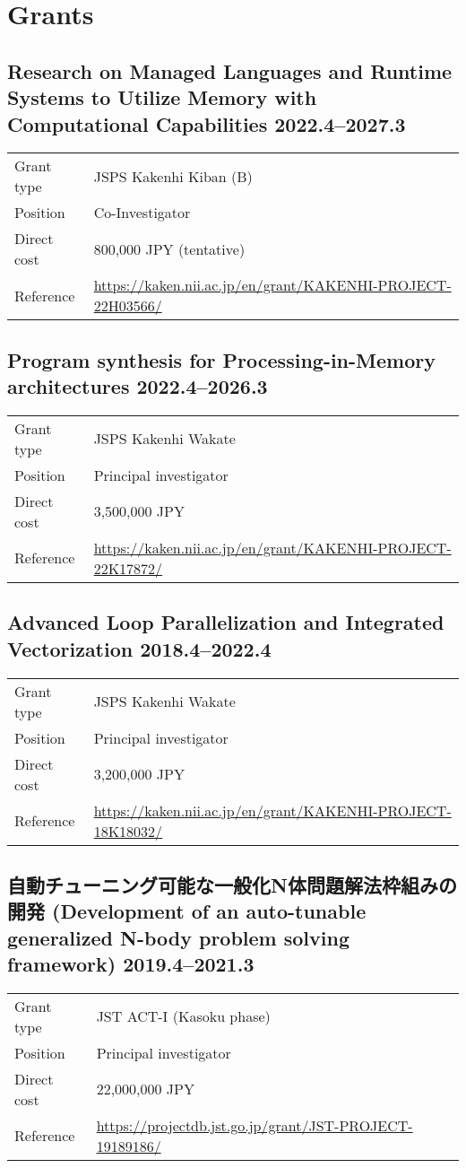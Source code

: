 \documentclass[a4paper,dvipdfmx]{article}
\newcommand{\datedsubsection}[2]{%
  \subsection[#1]{#1 \hfill #2}%
}
\begin{document}
\section{Grants}

\datedsubsection{Research on Managed Languages and Runtime Systems to
Utilize Memory with Computational Capabilities}{2022.4--2027.3}
\begin{flushleft}
\begin{tabular}[t]{lp{12cm}}
Grant type & JSPS Kakenhi Kiban (B) \\
Position & Co-Investigator \\
Direct cost & 800,000 JPY (tentative) \\
Reference & \url{https://kaken.nii.ac.jp/en/grant/KAKENHI-PROJECT-22H03566/} \\
\end{tabular}
\end{flushleft}

\datedsubsection{Program synthesis for Processing-in-Memory architectures}{2022.4--2026.3}
\begin{flushleft}
\begin{tabular}[t]{ll}
Grant type & JSPS Kakenhi Wakate \\
Position & Principal investigator \\
Direct cost & 3,500,000 JPY \\
Reference & \url{https://kaken.nii.ac.jp/en/grant/KAKENHI-PROJECT-22K17872/} \\
\end{tabular}
\end{flushleft}

\datedsubsection{Advanced Loop Parallelization and Integrated Vectorization}{2018.4--2022.4}
\begin{flushleft}
\begin{tabular}[t]{ll}
Grant type & JSPS Kakenhi Wakate \\
Position  & Principal investigator \\
Direct cost & 3,200,000 JPY \\
Reference & \url{https://kaken.nii.ac.jp/en/grant/KAKENHI-PROJECT-18K18032/} \\
\end{tabular}
\end{flushleft}

\datedsubsection{自動チューニング可能な一般化N体問題解法枠組みの開発
(Development of an auto-tunable generalized N-body problem solving framework)}{2019.4--2021.3}
\begin{flushleft}
\begin{tabular}[t]{ll}
Grant type & JST ACT-I (Kasoku phase)\\
Position  & Principal investigator \\
Direct cost & 22,000,000 JPY \\
Reference & \url{https://projectdb.jst.go.jp/grant/JST-PROJECT-19189186/} \\
\end{tabular}
\end{flushleft}
\end{document}
